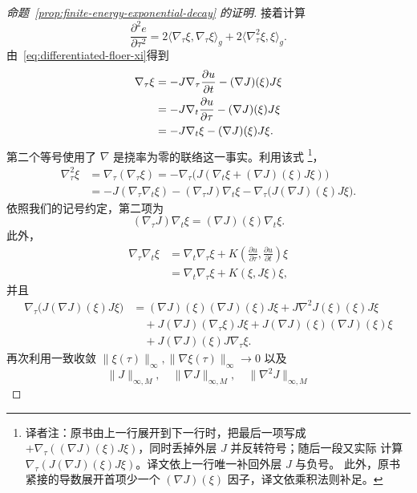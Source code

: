 \begin{proof}[命题~\ref{prop:finite-energy-exponential-decay} 的证明]
接着计算
\begin{equation}
  \frac{\partial^2e}{\partial\tau^2}
  =2\langle\nabla_\tau\xi,\nabla_\tau\xi\rangle_g
   +2\langle\nabla_\tau^2\xi,\xi\rangle_g.
\label{eq:tau-second-energy-density}
\end{equation}
由~\eqref{eq:differentiated-floer-xi}得到
\begin{align}
  \nabla_\tau\xi
  &=-J\nabla_\tau\frac{\partial u}{\partial t}
    -(\nabla J)(\xi)J\xi \notag\\
  &=-J\nabla_t\frac{\partial u}{\partial\tau}
    -(\nabla J)(\xi)J\xi \notag\\
  &=-J\nabla_t\xi-(\nabla J)(\xi)J\xi.
\label{eq:tau-derivative-xi}
\end{align}
第二个等号使用了 $\nabla$ 是挠率为零的\personLeviCivita{}联络这一事实。利用该式
\footnote{译者注：原书由上一行展开到下一行时，把最后一项写成
$+\nabla_\tau((\nabla J)(\xi)J\xi)$，同时丢掉外层 $J$ 并反转符号；随后一段又实际
计算 $\nabla_\tau(J(\nabla J)(\xi)J\xi)$。译文依上一行唯一补回外层 $J$ 与负号。
此外，原书紧接的导数展开首项少一个 $(\nabla J)(\xi)$ 因子，译文依乘积法则补足。}，
\[
  \begin{aligned}
  \nabla_\tau^2\xi
  &=\nabla_\tau(\nabla_\tau\xi)
   =-\nabla_\tau\bigl(J(\nabla_t\xi+(\nabla J)(\xi)J\xi)\bigr)\\
  &=-J(\nabla_\tau\nabla_t\xi)
    -(\nabla_\tau J)\nabla_t\xi
    -\nabla_\tau\bigl(J(\nabla J)(\xi)J\xi\bigr).
  \end{aligned}
\]
依照我们的记号约定，第二项为
\[
  (\nabla_\tau J)\nabla_t\xi
  =(\nabla J)(\xi)\nabla_t\xi.
\]
此外，
\[
  \begin{aligned}
  \nabla_\tau\nabla_t\xi
  &=\nabla_t\nabla_\tau\xi
    +K\left(\frac{\partial u}{\partial\tau},
             \frac{\partial u}{\partial t}\right)\xi\\
  &=\nabla_t\nabla_\tau\xi+K(\xi,J\xi)\xi,
  \end{aligned}
\]
并且
\[
  \begin{aligned}
  \nabla_\tau\bigl(J(\nabla J)(\xi)J\xi\bigr)
  &=(\nabla J)(\xi)(\nabla J)(\xi)J\xi
    +J\nabla^2J(\xi)(\xi)J\xi\\
  &\quad+J(\nabla J)(\nabla_\tau\xi)J\xi
    +J(\nabla J)(\xi)(\nabla J)(\xi)\xi\\
  &\quad+J(\nabla J)(\xi)J\nabla_\tau\xi.
  \end{aligned}
\]
再次利用一致收敛
$\|\xi(\tau)\|_\infty,\|\nabla\xi(\tau)\|_\infty\to0$ 以及
\[
  \|J\|_{\infty,M},
  \quad
  \|\nabla J\|_{\infty,M},
  \quad
  \|\nabla^2J\|_{\infty,M}
\]
\end{proof}
